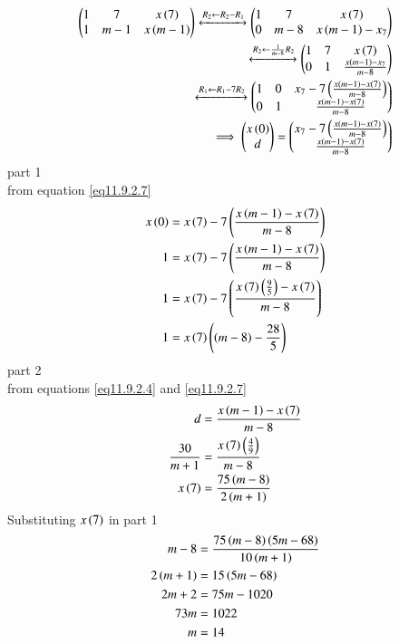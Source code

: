 \documentclass[journal,12pt,twocolumn]{IEEEtran}
\theoremstyle{remark}
\begin{document}
\begin{align}
 \begin{pmatrix}
   1 & 7 & x\left(7\right)
   \\
   1 & m-1 & x\left(m-1\right)
 \end{pmatrix}
 \xleftrightarrow[]{R_2 \leftarrow {R_2-R_1}}
 \begin{pmatrix}
   1 & 7 & x\left(7\right)
   \\
   0 & m-8 & x\left(m-1\right)-x_7
 \end{pmatrix}
 \\
 \xleftrightarrow[]{R_2 \leftarrow {\frac{1}{m-8}R_2}}
 \begin{pmatrix}
   1 & 7 & x\left(7\right)
   \\
   0 & 1 & \frac{x\left(m-1\right)-x_7}{m-8}
 \end{pmatrix}
 \\
 \xleftrightarrow[]{R_1 \leftarrow {R_1-7{R_2}}}
 \begin{pmatrix}
   1 & 0 & x_7-7\left(\frac{x\left(m-1\right)-x\left(7\right)}{m-8}\right)
   \\
   0 & 1 & \frac{x\left(m-1\right)-x\left(7\right)}{m-8}
 \end{pmatrix}
 \\
 \implies \begin{pmatrix}
   x\left(0\right)
   \\
   d
 \end{pmatrix}
 =
 \begin{pmatrix}
   x_7-7\left(\frac{x\left(m-1\right)-x\left(7\right)}{m-8}\right)
   \\
   \frac{x\left(m-1\right)-x\left(7\right)}{m-8}
 \end{pmatrix}
\end{align}
part 1\\
from equation \eqref{eq11.9.2.7}\\
\begin{align}
    x\left(0\right)&=x\left(7\right)-7\left(\frac{x\left(m-1\right)-x\left(7\right)}{m-8}\right)\\
    1&=x\left(7\right)-7\left(\frac{x\left(m-1\right)-x\left(7\right)}{m-8}\right)\\
    1&=x\left(7\right)-7\left(\frac{x\left(7\right)\left(\frac{9}{5}\right)-x\left(7\right)}{m-8}\right)\\
    1&=x\left(7\right)\left(\left(m-8\right)-\frac{28}{5}\right)
\end{align}
part 2\\
from equations \eqref{eq11.9.2.4} and \eqref{eq11.9.2.7}\\
 \begin{align}
    d&=\frac{x\left(m-1\right)-x\left(7\right)}{m-8}\\
    \frac{30}{m+1}&=\frac{x\left(7\right)\left(\frac{4}{9}\right)}{m-8}\\
    x\left(7\right)&=\frac{75\left(m-8\right)}{2\left(m+1\right)}\\
 \end{align}
Substituting $x\left(7\right)$ in part 1\\
 \begin{align}
    m-8&=\frac{75\left(m-8\right)\left(5m-68\right)}{10\left(m+1\right)}\\
    2\left(m+1\right)&=15\left(5m-68\right)\\
    2m+2&=75m-1020\\
    73m&=1022\\
    m&=14
 \end{align}
\end{document}
